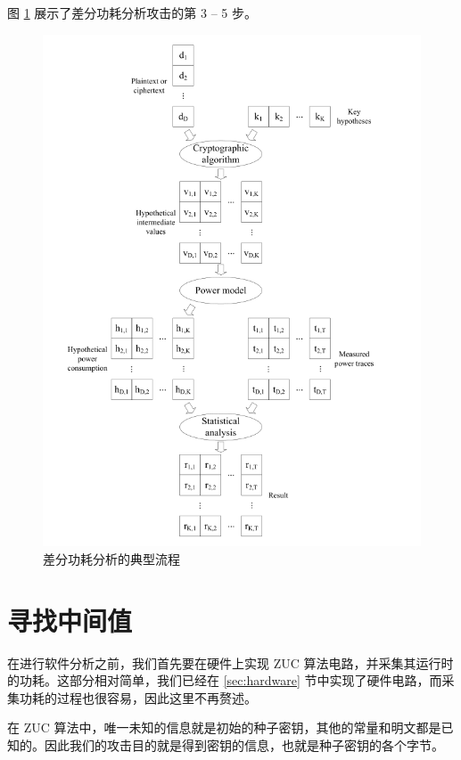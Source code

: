 图 \ref{fig:dpa} 展示了差分功耗分析攻击的第 3 -- 5 步。

\begin{figure}[htbp]

    \centering
    \includegraphics[height=.6\textheight]{../images/dpa.png}
    \caption{差分功耗分析的典型流程\cite{paa_en}}
    \label{fig:dpa}
\end{figure}

\section{寻找中间值}

在进行软件分析之前，我们首先要在硬件上实现 ZUC 算法电路，并采集其运行时的功耗。这部分相对简单，我们已经在 \ref{sec:hardware} 节中实现了硬件电路，而采集功耗的过程也很容易，因此这里不再赘述。

在 ZUC 算法中，唯一未知的信息就是初始的种子密钥，其他的常量和明文都是已知的。因此我们的攻击目的就是得到密钥的信息，也就是种子密钥的各个字节。

